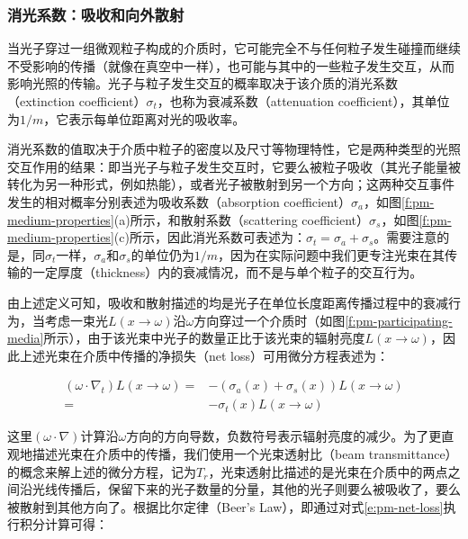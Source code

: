 \subsubsection{消光系数：吸收和向外散射}
当光子穿过一组微观粒子构成的介质时，它可能完全不与任何粒子发生碰撞而继续不受影响的传播（就像在真空中一样），也可能与其中的一些粒子发生交互，从而影响光照的传输。光子与粒子发生交互的概率取决于该介质的消光系数（extinction coefficient）$\sigma_t$，也称为衰减系数（attenuation coefficient），其单位为$1/m$，它表示每单位距离对光的吸收率。

消光系数的值取决于介质中粒子的密度以及尺寸等物理特性，它是两种类型的光照交互作用的结果：即当光子与粒子发生交互时，它要么被粒子吸收（其光子能量被转化为另一种形式，例如热能），或者光子被散射到另一个方向；这两种交互事件发生的相对概率分别表述为吸收系数（absorption coefficient）$\sigma_a$，如图\ref{f:pm-medium-properties}(a)所示，和散射系数（scattering coefficient）$\sigma_s$，如图\ref{f:pm-medium-properties}(c)所示，因此消光系数可表述为：$\sigma_t=\sigma_a+\sigma_s$。需要注意的是，同$\sigma_t$一样，$\sigma_a$和$\sigma_s$的单位仍为$1/m$，因为在实际问题中我们更专注光束在其传输的一定厚度（thickness）内的衰减情况，而不是与单个粒子的交互行为。

由上述定义可知，吸收和散射描述的均是光子在单位长度距离传播过程中的衰减行为，当考虑一束光$L(x\to{\omega})$沿$\omega$方向穿过一个介质时（如图\ref{f:pm-participating-media}所示），由于该光束中光子的数量正比于该光束的辐射亮度$L(x\to{\omega})$，因此上述光束在介质中传播的净损失（net loss）可用微分方程表述为：

\begin{equation}\label{e:pm-net-loss}
\begin{aligned}
	({\omega}\cdot\nabla_t)L(x\to{\omega})=&-(\sigma_a(x)+\sigma_s(x))L(x\to{\omega})\\
	=&-\sigma_t(x)L(x\to{\omega})
\end{aligned}
\end{equation}

\noindent 这里$({\omega}\cdot\nabla)$计算沿${\omega}$方向的方向导数，负数符号表示辐射亮度的减少。为了更直观地描述光束在介质中的传播，我们使用一个光束透射比（beam transmittance）的概念来解上述的微分方程，记为$T_r$，光束透射比描述的是光束在介质中的两点之间沿光线传播后，保留下来的光子数量的分量，其他的光子则要么被吸收了，要么被散射到其他方向了。根据比尔定律（Beer’s Law），即通过对式\ref{e:pm-net-loss}执行积分计算可得：

